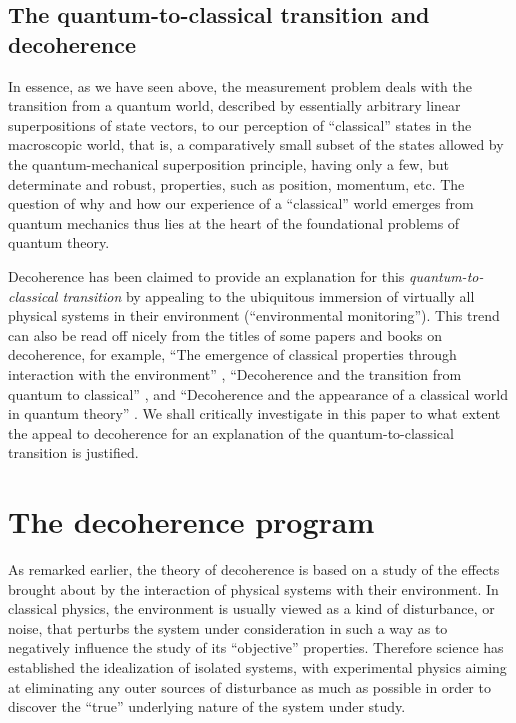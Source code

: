 \documentclass[rmp,aps,amsmath,amsfonts,noshowkeys,noshowpacs,12pt]{revtex4}
\begin{document}
\subsection{The quantum-to-classical transition and decoherence}

In essence, as we have seen above, the measurement problem deals with
the transition from a quantum world, described by essentially
arbitrary linear superpositions of state vectors, to our perception of
``classical'' states in the macroscopic world, that is, a
comparatively small subset of the states allowed by the quantum-mechanical
superposition principle, having only a few, but determinate and robust,
properties, such as position, momentum, etc. The question of why and
how our experience of a ``classical'' world emerges from quantum
mechanics thus lies at the heart of the foundational problems of
quantum theory.

Decoherence has been claimed to provide an explanation for this
\emph{quantum-to-classical transition} by appealing to the ubiquitous
immersion of virtually all physical systems in their environment
(``environmental monitoring'').  This trend can also be read off
nicely from the titles of some papers and books on decoherence, for
example, ``The emergence of classical properties through interaction
with the environment'' \citep{Joos:1985:iu}, ``Decoherence and the
transition from quantum to classical'' \citep{Zurek:1991:vv}, and
``Decoherence and the appearance of a classical world in quantum
theory'' \citep{Joos:2003:jh}. We shall critically investigate in this
paper to what extent the appeal to decoherence for an explanation of
the quantum-to-classical transition is justified.


\section{\label{sec:decoherence}The decoherence program}

As remarked earlier, the theory of decoherence is based on a study of
the effects brought about by the interaction of physical systems with
their environment. In classical physics, the environment is usually
viewed as a kind of disturbance, or noise, that perturbs the system
under consideration in such a way as to negatively influence the study
of its ``objective'' properties. Therefore science has established the
idealization of isolated systems, with experimental physics aiming at
eliminating any outer sources of disturbance as much as possible in
order to discover the ``true'' underlying nature of the system under
study.
\end{document}
